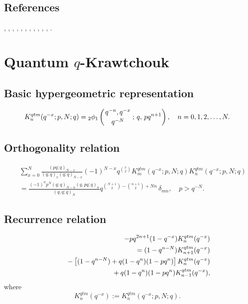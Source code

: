 \documentclass[envcountchap,graybox]{svmono}
\newcommand{\qhyp}[5]{\mbox{}_{#1}{\phi}_{#2}
\left(\genfrac{}{}{0pt}{}{#3}{#4}\,;\,q,\,#5\right)}
\newcommand{\mathindent}{\hspace{7.5mm}}
\begin{document}
\subsection*{References}
\cite{AlSalam90}, \cite{AlSalamVerma82II}, \cite{AlSalamVerma88}, \cite{AlvarezRonveaux},
\cite{AtakAtakKlimyk}, \cite{AtakRahmanSuslov}, \cite{Campigotto+}, \cite{GasperRahman90},
\cite{Hahn}, \cite{Ismail2005I}, \cite{Nikiforov+}, \cite{Smirnov}.


\section{Quantum $q$-Krawtchouk}
\par\setcounter{equation}{0}

\subsection*{Basic hypergeometric representation}
\begin{equation}
\label{DefQuantumqKrawtchouk}
K_n^{qtm}(q^{-x};p,N;q)=
\qhyp{2}{1}{q^{-n},q^{-x}}{q^{-N}}{pq^{n+1}},\quad n=0,1,2,\ldots,N.
\end{equation}

\subsection*{Orthogonality relation}
\begin{eqnarray}
\label{OrtQuantumqKrawtchouk}
& &\sum_{x=0}^N\frac{(pq;q)_{N-x}}{(q;q)_x(q;q)_{N-x}}(-1)^{N-x}q^{\binom{x}{2}}
K_m^{qtm}(q^{-x};p,N;q)K_n^{qtm}(q^{-x};p,N;q)\nonumber\\
& &{}=\frac{(-1)^np^N(q;q)_{N-n}(q,pq;q)_n}{(q,q;q)_N}
q^{\binom{N+1}{2}-\binom{n+1}{2}+Nn}\,\delta_{mn},\quad p>q^{-N}.
\end{eqnarray}

\subsection*{Recurrence relation}
\begin{eqnarray}
\label{RecQuantumqKrawtchouk}
& &-pq^{2n+1}(1-q^{-x})K_n^{qtm}(q^{-x})\nonumber\\
& &{}=(1-q^{n-N})K_{n+1}^{qtm}(q^{-x})\nonumber\\
& &{}\mathindent{}-\left[(1-q^{n-N})+q(1-q^n)(1-pq^n)\right]K_n^{qtm}(q^{-x})\nonumber\\
& &{}\mathindent\mathindent{}+q(1-q^n)(1-pq^n)K_{n-1}^{qtm}(q^{-x}),
\end{eqnarray}
where
$$K_n^{qtm}(q^{-x}):=K_n^{qtm}(q^{-x};p,N;q).$$
\end{document}
